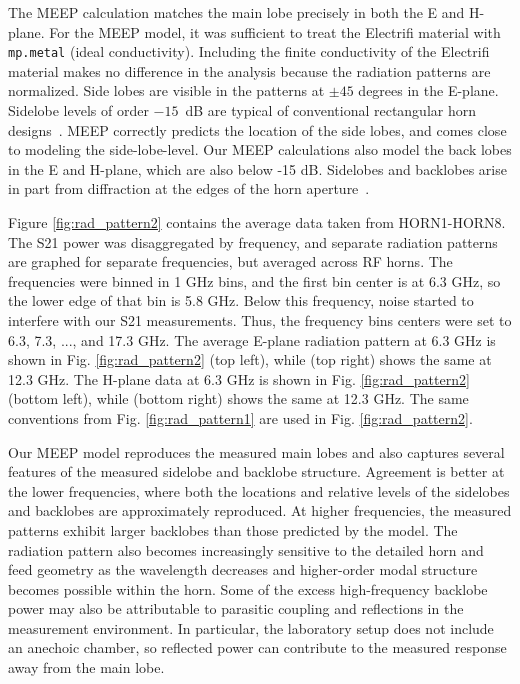 \documentclass[electronics,article,submit,pdftex,moreauthors]{Definitions/mdpi}
\begin{document}
The MEEP calculation matches the main lobe precisely in both the E and H-plane.  For the MEEP model, it was sufficient to treat the Electrifi material with \texttt{mp.metal} (ideal conductivity).  Including the finite conductivity of the Electrifi material makes no difference in the analysis because the radiation patterns are normalized.  Side lobes are visible in the patterns at $\pm 45$ degrees in the E-plane.  Sidelobe levels of order $-15$~dB are typical of conventional rectangular horn designs~\cite{Bull2025RHINO}.  MEEP correctly predicts the location of the side lobes, and comes close to modeling the side-lobe-level.  Our MEEP calculations also model the back lobes in the E and H-plane, which are also below -15 dB.  Sidelobes and backlobes arise in part from diffraction at the edges of the horn aperture~\cite{Yu1966HornDiffraction}.

Figure \ref{fig:rad_pattern2} contains the average data taken from HORN1-HORN8.  The S21 power was disaggregated by frequency, and separate radiation patterns are graphed for separate frequencies, but averaged across RF horns.  The frequencies were binned in 1 GHz bins, and the first bin center is at 6.3 GHz, so the lower edge of that bin is 5.8 GHz.  Below this frequency, noise started to interfere with our S21 measurements.  Thus, the frequency bins centers were set to 6.3, 7.3, ..., and 17.3 GHz.  The average E-plane radiation pattern at 6.3 GHz is shown in Fig. \ref{fig:rad_pattern2} (top left), while (top right) shows the same at 12.3 GHz.  The H-plane data at 6.3 GHz is shown in Fig. \ref{fig:rad_pattern2} (bottom left), while (bottom right) shows the same at 12.3 GHz.  The same conventions from Fig. \ref{fig:rad_pattern1} are used in Fig. \ref{fig:rad_pattern2}.

Our MEEP model reproduces the measured main lobes and also captures several features of the measured sidelobe and backlobe structure. Agreement is better at the lower frequencies, where both the locations and relative levels of the sidelobes and backlobes are approximately reproduced. At higher frequencies, the measured patterns exhibit larger backlobes than those predicted by the model. The radiation pattern also becomes increasingly sensitive to the detailed horn and feed geometry as the wavelength decreases and higher-order modal structure becomes possible within the horn. Some of the excess high-frequency backlobe power may also be attributable to parasitic coupling and reflections in the measurement environment. In particular, the laboratory setup does not include an anechoic chamber, so reflected power can contribute to the measured response away from the main lobe.
\end{document}
